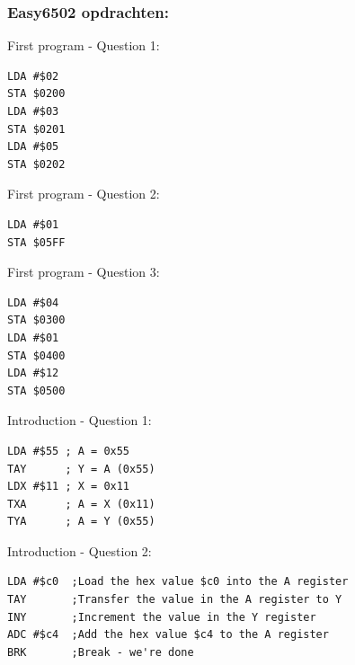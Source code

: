     
    
    
    
\subsubsection{Easy6502 opdrachten:}
    
First program - Question 1:
\begin{lstlisting}[language=asm6502]
LDA #$02
STA $0200
LDA #$03
STA $0201
LDA #$05
STA $0202
\end{lstlisting}

First program - Question 2:
\begin{lstlisting}[language=asm6502]
LDA #$01
STA $05FF
\end{lstlisting}

First program - Question 3:
\begin{lstlisting}[language=asm6502]
LDA #$04
STA $0300
LDA #$01
STA $0400
LDA #$12
STA $0500
\end{lstlisting}

Introduction - Question 1:
\begin{lstlisting}[language=asm6502]
LDA #$55 ; A = 0x55
TAY      ; Y = A (0x55)
LDX #$11 ; X = 0x11
TXA      ; A = X (0x11)
TYA      ; A = Y (0x55)
\end{lstlisting}

Introduction - Question 2:
\begin{lstlisting}[language=asm6502]
LDA #$c0  ;Load the hex value $c0 into the A register
TAY       ;Transfer the value in the A register to Y
INY       ;Increment the value in the Y register
ADC #$c4  ;Add the hex value $c4 to the A register
BRK       ;Break - we're done
\end{lstlisting}

